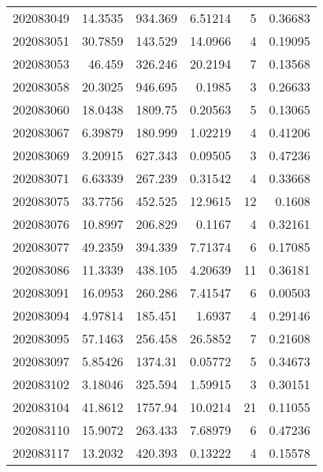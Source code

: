\begin{tabular}{rrrrrr}
 202083049 &         14.3535  &      934.369  &            6.51214 &           5 & 0.36683 \\
 202083051 &         30.7859  &      143.529  &           14.0966  &           4 & 0.19095 \\
 202083053 &         46.459   &      326.246  &           20.2194  &           7 & 0.13568 \\
 202083058 &         20.3025  &      946.695  &            0.1985  &           3 & 0.26633 \\
 202083060 &         18.0438  &     1809.75   &            0.20563 &           5 & 0.13065 \\
 202083067 &          6.39879 &      180.999  &            1.02219 &           4 & 0.41206 \\
 202083069 &          3.20915 &      627.343  &            0.09505 &           3 & 0.47236 \\
 202083071 &          6.63339 &      267.239  &            0.31542 &           4 & 0.33668 \\
 202083075 &         33.7756  &      452.525  &           12.9615  &          12 & 0.1608  \\
 202083076 &         10.8997  &      206.829  &            0.1167  &           4 & 0.32161 \\
 202083077 &         49.2359  &      394.339  &            7.71374 &           6 & 0.17085 \\
 202083086 &         11.3339  &      438.105  &            4.20639 &          11 & 0.36181 \\
 202083091 &         16.0953  &      260.286  &            7.41547 &           6 & 0.00503 \\
 202083094 &          4.97814 &      185.451  &            1.6937  &           4 & 0.29146 \\
 202083095 &         57.1463  &      256.458  &           26.5852  &           7 & 0.21608 \\
 202083097 &          5.85426 &     1374.31   &            0.05772 &           5 & 0.34673 \\
 202083102 &          3.18046 &      325.594  &            1.59915 &           3 & 0.30151 \\
 202083104 &         41.8612  &     1757.94   &           10.0214  &          21 & 0.11055 \\
 202083110 &         15.9072  &      263.433  &            7.68979 &           6 & 0.47236 \\
 202083117 &         13.2032  &      420.393  &            0.13222 &           4 & 0.15578 \\

\end{tabular}

